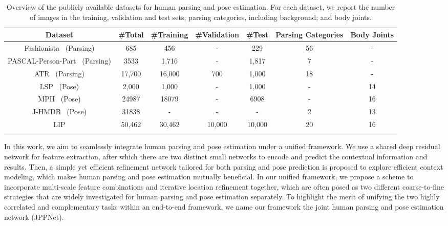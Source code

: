 \documentclass[10pt,journal,compsoc]{IEEEtran}
\begin{document}
\begin{table*}[t]
\centering
\normalsize
\caption{Overview of the publicly available datasets for human parsing and pose estimation. For each dataset, we report the number of images in the training, validation and test sets; parsing categories, including background; and body joints.}
\vspace{-3mm}
\label{tab:dataset_num}
\begin{tabular}{ccccccc}
\toprule[0.7pt]
    Dataset                                  & \#Total & \#Training   & \#Validation  & \#Test & Parsing Categories & Body Joints   \\ \hline 
    Fashionista~\cite{yamaguchi2012parsing} (Parsing)  &  685     & 456          & -           & 229       &     56          &      -        \\
    PASCAL-Person-Part~\cite{chen2014detect} (Parsing) &  3533    & 1,716        & -           & 1,817     &     7           &      -        \\
    ATR~\cite{Co-CNN} (Parsing)                        &  17,700  & 16,000       & 700         & 1,000     &     18          &      -        \\ 
    LSP~\cite{Johnson10} (Pose)                      &  2,000     & 1,000        & -           & 1,000     &     -           &      14       \\
    MPII~\cite{andriluka14cvpr} (Pose)               &  24987     & 18079        & -           & 6908      &     -           &      16  \\ 
    {J-HMDB~\cite{Jhuang:ICCV:2013} (Pose)} &  31838     & -        & -           & -      &     2           &      13  \\ \hline 
    LIP                                              &  {50,462}  & 30,462       & 10,000    & 10,000    &  20      &      16       \\ 
\toprule[0.7pt]
\vspace{-2mm}
\end{tabular}
\end{table*}



In this work, we aim to seamlessly integrate human parsing and pose estimation under a unified framework. We use a shared deep residual network for feature extraction, after which there are two distinct small networks to encode and predict the contextual information and results. Then, a simple yet efficient refinement network tailored for both parsing and pose prediction is proposed to explore efficient context modeling, which makes human parsing and pose estimation mutually beneficial. In our unified framework, we propose a scheme to incorporate multi-scale feature combinations and iterative location refinement together, which are often posed as two different coarse-to-fine strategies that are widely investigated for human parsing and pose estimation separately. To highlight the merit of unifying the two highly correlated and complementary tasks within an end-to-end framework, we name our framework the joint human parsing and pose estimation network (JPPNet).
\end{document}
